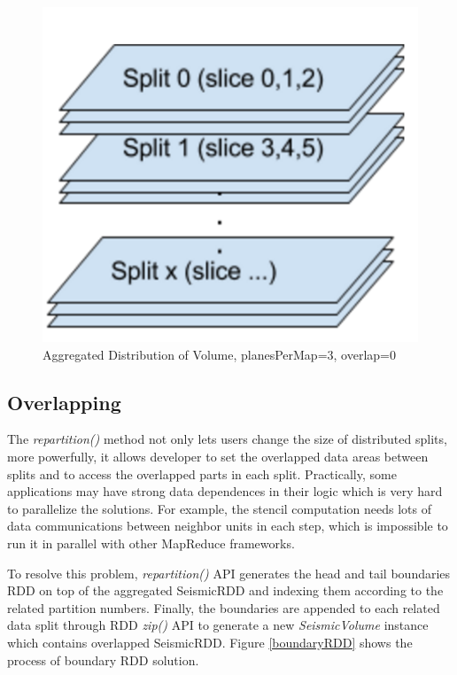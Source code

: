 \begin{figure}[h]
\centering
\includegraphics[scale=0.6]{figures/Aggregation.png}
\caption{Aggregated Distribution of Volume, planesPerMap=3, overlap=0}
\label{Aggregation}
\end{figure}

\subsection{Overlapping}

The \emph{repartition()} method not only lets users change the size of distributed splits, more powerfully, it allows developer to set the overlapped data areas between splits and to access the overlapped parts in each split. Practically, some applications may have strong data dependences in their logic which is very hard to parallelize the solutions. For example, the stencil computation needs lots of data communications between neighbor units in each step, which is impossible to run it in parallel with other MapReduce frameworks. 

To resolve this problem, \emph{repartition()} API generates the head and tail boundaries RDD on top of the aggregated SeismicRDD and indexing them according to the related partition numbers. Finally, the boundaries are appended to each related data split through RDD \emph{zip()} API to generate a new \emph{SeismicVolume} instance which contains overlapped SeismicRDD. Figure \ref{boundaryRDD} shows the process of boundary RDD solution.

